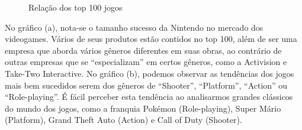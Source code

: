 \documentclass[draft]{agujournal2018}
\begin{document}
\begin{figure}[h]
\caption{Relação dos top 100 jogos}\label{fig:unnamed-chunk-9}
\end{figure}

No gráfico (a), nota-se o tamanho sucesso da Nintendo no mercado dos
videogames. Vários de seus produtos estão contidos no top 100, além de
ser uma empresa que aborda vários gêneros diferentes em suas obras, ao
contrário de outras empresas que se ``especializam'' em certos gêneros,
como a Activision e Take-Two Interactive. No gráfico (b), podemos
observar as tendências dos jogos mais bem sucedidos serem dos gêneros de
``Shooter'', ``Platform'', ``Action'' ou ``Role-playing''. É fácil
perceber esta tendência ao analisarmos grandes clássicos do mundo dos
jogos, como a franquia Pokémon (Role-playing), Super Mário (Platform),
Grand Theft Auto (Action) e Call of Duty (Shooter).
\end{document}
